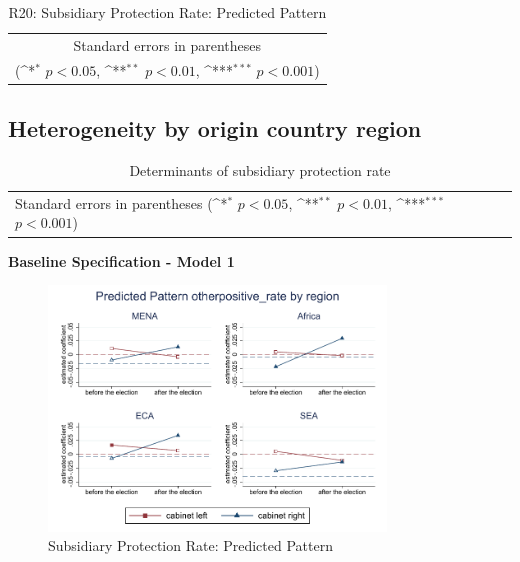 \documentclass[10pt,a4paper]{scrartcl}
\begin{document}
\begin{table}[!ht]\centering
	\footnotesize
	\renewcommand{\arraystretch}{1.2}
	\def\sym#1{\ifmmode^{#1}\else\(^{#1}\)\fi}
	\caption{R20: Subsidiary Protection Rate: Predicted Pattern}
	\begin{tabular}{l*{2}{c}}
		\hline\hline
		
		\hline\hline
		\multicolumn{3}{c}{\footnotesize Standard errors in parentheses} \\
		\multicolumn{3}{c}{\footnotesize (\sym{*} \(p<0.05\), \sym{**} \(p<0.01\), \sym{***} \(p<0.001\))} \\
	\end{tabular}
\end{table}


\clearpage
\FloatBarrier
\subsection{Heterogeneity by origin country region}
\begin{table}[!ht]\centering
	\renewcommand{\arraystretch}{1.25}
	\small
	\def\sym#1{\ifmmode^{#1}\else\(^{#1}\)\fi}
	\caption{Determinants of subsidiary protection rate}
	\begin{tabular}{l*{4}{c}}
		\hline\hline
		
		\hline\hline
		\multicolumn{5}{l}{\footnotesize Standard errors in parentheses (\sym{*} \(p<0.05\), \sym{**} \(p<0.01\), \sym{***} \(p<0.001\))}\\
	\end{tabular}
\end{table}

\clearpage
\textbf{Baseline Specification - Model 1}
\begin{figure}[!ht]
	\centering
	\includegraphics[width=0.8\textwidth]{figures_edited/otherpositive_rate_graph1_by_region.pdf}
	\caption{Subsidiary Protection Rate: Predicted Pattern}
\end{figure}
\end{document}
